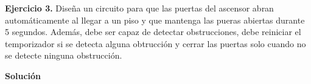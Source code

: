 \textbf{Ejercicio 3.} Diseña un circuito para que las puertas del ascensor 
abran automáticamente al llegar a un piso y que mantenga las pueras abiertas 
durante 5 segundos. Además, debe ser capaz de detectar obstrucciones, debe 
reiniciar el temporizador si se detecta alguna obtrucción y cerrar las puertas 
solo cuando no se detecte ninguna obstrucción.

\textbf{Solución}


\newpage